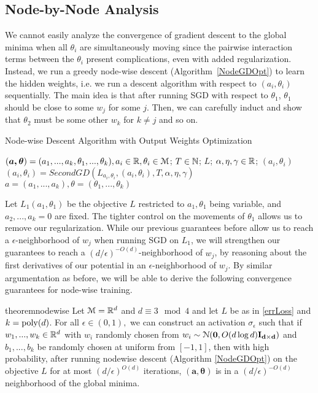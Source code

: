 \subsection{Node-by-Node Analysis}
We cannot easily analyze the convergence of gradient descent to the global minima when all $\theta_i$ are simultaneously moving since the pairwise interaction terms between the $\theta_i$ present complications, even with added regularization. Instead, we run a greedy
node-wise descent (Algorithm~\ref{NodeGDOpt}) to learn the hidden weights, i.e. we run a descent algorithm with respect to $(a_i,\theta_i)$ sequentially. The
main idea is that after running SGD with respect to $\theta_1$,
$\theta_1$ should be close to some $w_j$ for some $j$. Then, we can
carefully induct and show that $\theta_2$ must be some other $w_k$ for
$k\neq j$ and so on.

%
\begin{algorithm}[tb]
 \caption{Node-wise Descent Algorithm with Output Weights Optimization}
   \label{NodeGDOpt}
\begin{algorithmic}
  $(\boldsymbol{a,\theta}) = (a_1,...,a_k,\theta_1,...,\theta_k), a_i
  \in{\mathbb{R}}, \theta_i\in\mathcal{M}$;
  $T\in {\mathbb{N}}$; $L$; $\alpha, \eta, \gamma \in {\mathbb{R}}$; 
   $(a_i, \theta_i)$
  \State $(a_i, \theta_i) = SecondGD \left(L_{a_i, \theta_i},(a_i,\theta_i),T, \alpha,\eta,\gamma \right)$
   \EndFor
    $a = (a_1,...,a_k), \theta = (\theta_1,..., \theta_k)$
   \end{algorithmic}
\end{algorithm}

Let $L_1(a_1,\theta_1)$ be the objective $L$ restricted to $a_1,\theta_1$ being variable, and $a_2,...,a_k = 0$ are fixed. The tighter control on the movements of $\theta_1$ allows us to remove our regularization. While our previous guarantees before allow us to reach a $\epsilon$-neighborhood of $w_j$ when running SGD on $L_1$, we will strengthen our guarantees to reach a $(d/\epsilon)^{-O(d)}$-neighborhood of $w_j$, by reasoning about the first derivatives of our potential in an $\epsilon$-neighborhood of $w_j$. By similar argumentation as before, we will be able to derive the following convergence guarantees for node-wise training. 

\begin{restatable}{theorem}{nodewise}\label{nodeWise}
Let $\mathcal{M} = {\mathbb{R}}^{d}$ and $d \equiv 3 \mod 4$ and let $L$ be as in \ref{errLoss} and $k = \mathrm{poly}(d)$. For all $\epsilon \in (0,1),$ we can construct an activation $\sigma_\epsilon$ such that if $w_1,...,w_k \in {\mathbb{R}}^d$ with $w_i$ randomly chosen from $w_i \sim  \mathcal{N}({\bf 0}, O(d\log d){\bf I_{d\times d}})$ and $b_1,...,b_k$ be randomly chosen at uniform from $[-1,1]$, then with high probability, after running nodewise descent (Algorithm \ref{NodeGDOpt}) on the objective $L$ for at most $(d/\epsilon)^{O(d)}$ iterations, $\boldsymbol{(a,\theta)}$ is in a $(d/\epsilon)^{-O(d)}$ neighborhood of the global minima.
\end{restatable}

